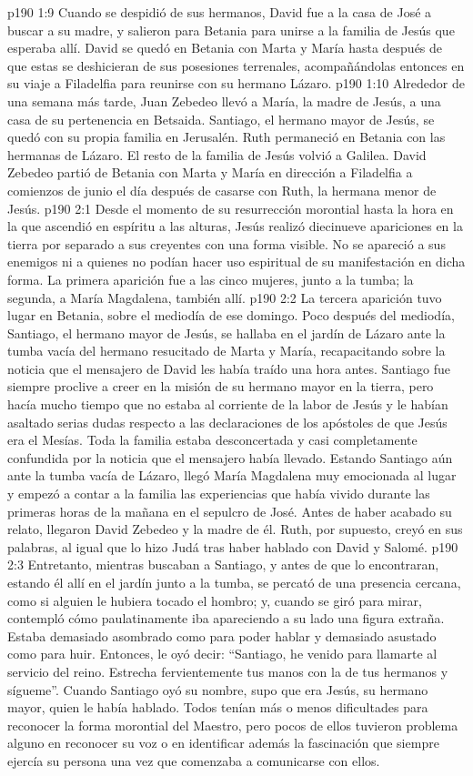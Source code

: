 \vs p190 1:9 Cuando se despidió de sus hermanos, David fue a la casa de José a buscar a su madre, y salieron para Betania para unirse a la familia de Jesús que esperaba allí. David se quedó en Betania con Marta y María hasta después de que estas se deshicieran de sus posesiones terrenales, acompañándolas entonces en su viaje a Filadelfia para reunirse con su hermano Lázaro.
\vs p190 1:10 Alrededor de una semana más tarde, Juan Zebedeo llevó a María, la madre de Jesús, a una casa de su pertenencia en Betsaida. Santiago, el hermano mayor de Jesús, se quedó con su propia familia en Jerusalén. Ruth permaneció en Betania con las hermanas de Lázaro. El resto de la familia de Jesús volvió a Galilea. David Zebedeo partió de Betania con Marta y María en dirección a Filadelfia a comienzos de junio el día después de casarse con Ruth, la hermana menor de Jesús.
\vs p190 2:1 Desde el momento de su resurrección morontial hasta la hora en la que ascendió en espíritu a las alturas, Jesús realizó diecinueve apariciones en la tierra por separado a sus creyentes con una forma visible. No se apareció a sus enemigos ni a quienes no podían hacer uso espiritual de su manifestación en dicha forma. La primera aparición fue a las cinco mujeres, junto a la tumba; la segunda, a María Magdalena, también allí.
\vs p190 2:2 La tercera aparición tuvo lugar en Betania, sobre el mediodía de ese domingo. Poco después del mediodía, Santiago, el hermano mayor de Jesús, se hallaba en el jardín de Lázaro ante la tumba vacía del hermano resucitado de Marta y María, recapacitando sobre la noticia que el mensajero de David les había traído una hora antes. Santiago fue siempre proclive a creer en la misión de su hermano mayor en la tierra, pero hacía mucho tiempo que no estaba al corriente de la labor de Jesús y le habían asaltado serias dudas respecto a las declaraciones de los apóstoles de que Jesús era el Mesías. Toda la familia estaba desconcertada y casi completamente confundida por la noticia que el mensajero había llevado. Estando Santiago aún ante la tumba vacía de Lázaro, llegó María Magdalena muy emocionada al lugar y empezó a contar a la familia las experiencias que había vivido durante las primeras horas de la mañana en el sepulcro de José. Antes de haber acabado su relato, llegaron David Zebedeo y la madre de él. Ruth, por supuesto, creyó en sus palabras, al igual que lo hizo Judá tras haber hablado con David y Salomé.
\vs p190 2:3 Entretanto, mientras buscaban a Santiago, y antes de que lo encontraran, estando él allí en el jardín junto a la tumba, se percató de una presencia cercana, como si alguien le hubiera tocado el hombro; y, cuando se giró para mirar, contempló cómo paulatinamente iba apareciendo a su lado una figura extraña. Estaba demasiado asombrado como para poder hablar y demasiado asustado como para huir. Entonces, le oyó decir: “Santiago, he venido para llamarte al servicio del reino. Estrecha fervientemente tus manos con la de tus hermanos y sígueme”. Cuando Santiago oyó su nombre, supo que era Jesús, su hermano mayor, quien le había hablado. Todos tenían más o menos dificultades para reconocer la forma morontial del Maestro, pero pocos de ellos tuvieron problema alguno en reconocer su voz o en identificar además la fascinación que siempre ejercía su persona una vez que comenzaba a comunicarse con ellos.
